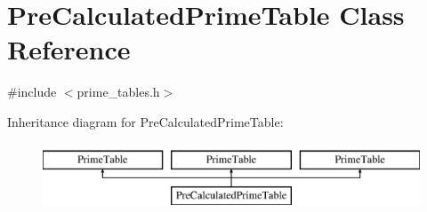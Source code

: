 \hypertarget{class_pre_calculated_prime_table}{}\section{Pre\+Calculated\+Prime\+Table Class Reference}
\label{class_pre_calculated_prime_table}


{\ttfamily \#include $<$prime\+\_\+tables.\+h$>$}

Inheritance diagram for Pre\+Calculated\+Prime\+Table\+:\begin{figure}[H]
\begin{center}
\leavevmode
\includegraphics[height=2.000000cm]{dd/d0a/class_pre_calculated_prime_table}
\end{center}
\end{figure}
